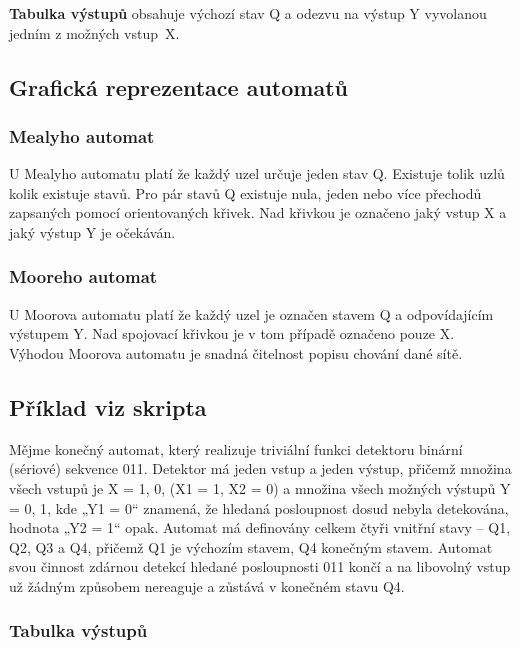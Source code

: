 \textbf{Tabulka výstupů}  obsahuje výchozí stav Q a odezvu na výstup Y vyvolanou jedním z možných vstup~X.

\subsection{Grafická reprezentace automatů}

\subsubsection{Mealyho automat}

U Mealyho automatu platí že každý uzel určuje jeden stav Q.
Existuje tolik uzlů kolik existuje stavů.
Pro pár stavů Q existuje nula, jeden nebo více přechodů zapsaných pomocí orientovaných křivek.
Nad křivkou je označeno jaký vstup X a jaký výstup Y je očekáván.

\subsubsection{Mooreho automat}

U Moorova automatu platí že každý uzel je označen stavem Q a odpovídajícím výstupem Y.
Nad spojovací křivkou je v tom případě označeno pouze X.
Výhodou Moorova automatu je snadná čitelnost popisu chování dané sítě.


\subsection{Příklad viz skripta}


Mějme konečný automat, který realizuje triviální funkci detektoru binární (sériové)
sekvence 011.
Detektor má jeden vstup a jeden výstup, přičemž množina všech vstupů je X = {1, 0}, (X1 = 1, X2 = 0) a množina všech možných výstupů Y = {0, 1}, kde „Y1 = 0“ znamená, že hledaná posloupnost dosud nebyla detekována, hodnota „Y2 = 1“ opak.
Automat má definovány celkem čtyři vnitřní stavy – Q1, Q2, Q3 a Q4, přičemž Q1 je výchozím stavem, Q4 konečným stavem.
Automat svou činnost zdárnou detekcí hledané posloupnosti 011 končí a na libovolný vstup už žádným způsobem nereaguje a zůstává v konečném stavu Q4.

\subsubsection{Tabulka výstupů}


